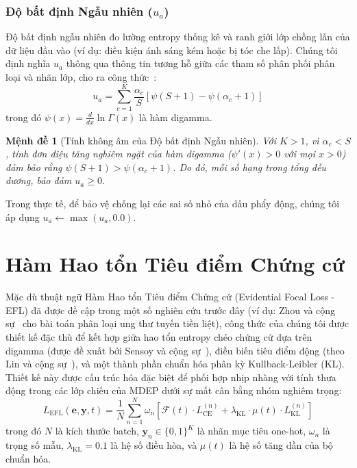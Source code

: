 \documentclass[11pt]{article}
\newtheorem{proposition}{Mệnh đề}
\begin{document}
\subsubsection{Độ bất định Ngẫu nhiên ($u_a$)}

Độ bất định ngẫu nhiên đo lường entropy thống kê và ranh giới lớp chồng lấn của dữ liệu đầu vào (ví dụ: điều kiện ánh sáng kém hoặc bị tóc che lấp). Chúng tôi định nghĩa $u_a$ thông qua thông tin tương hỗ giữa các tham số phân phối phân loại và nhãn lớp, cho ra công thức~\cite{malinin2018predictive}:
\begin{equation}\label{eq:u_a}
    u_a = \sum_{c=1}^K \frac{\alpha_c}{S} \left[ \psi(S + 1) - \psi(\alpha_c + 1) \right]
\end{equation}
trong đó $\psi(x) = \frac{d}{dx}\ln\Gamma(x)$ là hàm digamma.

\begin{proposition}[Tính không âm của Độ bất định Ngẫu nhiên]
Với $K > 1$, vì $\alpha_c < S$, tính đơn điệu tăng nghiêm ngặt của hàm digamma ($\psi'(x) > 0$ với mọi $x > 0$) đảm bảo rằng $\psi(S+1) > \psi(\alpha_c+1)$. Do đó, mỗi số hạng trong tổng đều dương, bảo đảm $u_a \ge 0$.
\end{proposition}

Trong thực tế, để bảo vệ chống lại các sai số nhỏ của dấu phẩy động, chúng tôi áp dụng $u_a \leftarrow \max(u_a, 0.0)$.

\section{Hàm Hao tổn Tiêu điểm Chứng cứ}\label{sec:efl}

Mặc dù thuật ngữ Hàm Hao tổn Tiêu điểm Chứng cứ (Evidential Focal Loss - EFL) đã được đề cập trong một số nghiên cứu trước đây (ví dụ: Zhou và cộng sự~\cite{zhou2023domain} cho bài toán phân loại ung thư tuyến tiền liệt), công thức của chúng tôi được thiết kế đặc thù để kết hợp giữa hao tổn entropy chéo chứng cứ dựa trên digamma (được đề xuất bởi Sensoy và cộng sự~\cite{sensoy2018evidential}), điều biến tiêu điểm động (theo Lin và cộng sự~\cite{lin2017focal}), và một thành phần chuẩn hóa phân kỳ Kullback-Leibler (KL). Thiết kế này được cấu trúc hóa đặc biệt để phối hợp nhịp nhàng với tính thưa động trong các lớp chiếu của MDEP dưới sự mất cân bằng nhóm nghiêm trọng:
\begin{equation}\label{eq:efl}
    L_{\text{EFL}}(\bm{e}, \bm{y}, t) = \frac{1}{N} \sum_{n=1}^N \omega_n \left[ \mathcal{F}(t) \cdot L_{\text{CE}}^{(n)} + \lambda_{\text{KL}} \cdot \mu(t) \cdot L_{\text{KL}}^{(n)} \right]
\end{equation}
trong đó $N$ là kích thước batch, $\bm{y}_n \in \{0, 1\}^K$ là nhãn mục tiêu one-hot, $\omega_n$ là trọng số mẫu, $\lambda_{\text{KL}} = 0.1$ là hệ số điều hòa, và $\mu(t)$ là hệ số tăng dần của bộ chuẩn hóa.
\end{document}
